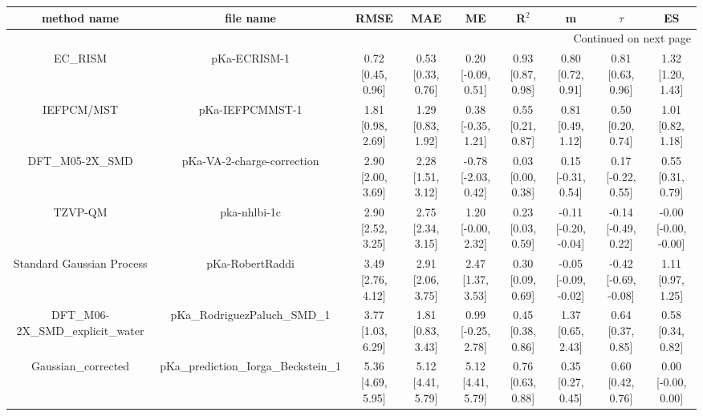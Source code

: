 \documentclass{article}
\begin{document}
\begin{center}
\scriptsize
\begin{longtable}{|ccccccccc|}
\toprule
                   method name &                             file name &               RMSE &                MAE &                   ME &              R$^2$ &                     m &                $\tau$ &                    ES \\
\midrule
\endhead
\midrule
\multicolumn{9}{r}{{Continued on next page}} \\
\midrule
\endfoot

\bottomrule
\endlastfoot
                       EC_RISM &                          pKa-ECRISM-1 &  0.72 [0.45, 0.96] &  0.53 [0.33, 0.76] &   0.20 [-0.09, 0.51] &  0.93 [0.87, 0.98] &     0.80 [0.72, 0.91] &     0.81 [0.63, 0.96] &     1.32 [1.20, 1.43] \\
                    IEFPCM/MST &                       pKa-IEFPCMMST-1 &  1.81 [0.98, 2.69] &  1.29 [0.83, 1.92] &   0.38 [-0.35, 1.21] &  0.55 [0.21, 0.87] &     0.81 [0.49, 1.12] &     0.50 [0.20, 0.74] &     1.01 [0.82, 1.18] \\
                DFT_M05-2X_SMD &            pKa-VA-2-charge-correction &  2.90 [2.00, 3.69] &  2.28 [1.51, 3.12] &  -0.78 [-2.03, 0.42] &  0.03 [0.00, 0.38] &    0.15 [-0.31, 0.54] &    0.17 [-0.22, 0.55] &     0.55 [0.31, 0.79] \\
                       TZVP-QM &                          pka-nhlbi-1c &  2.90 [2.52, 3.25] &  2.75 [2.34, 3.15] &   1.20 [-0.00, 2.32] &  0.23 [0.03, 0.59] &  -0.11 [-0.20, -0.04] &   -0.14 [-0.49, 0.22] &  -0.00 [-0.00, -0.00] \\
     Standard Gaussian Process &                       pKa-RobertRaddi &  3.49 [2.76, 4.12] &  2.91 [2.06, 3.75] &    2.47 [1.37, 3.53] &  0.30 [0.09, 0.69] &  -0.05 [-0.09, -0.02] &  -0.42 [-0.69, -0.08] &     1.11 [0.97, 1.25] \\
 DFT_M06-2X_SMD_explicit_water &          pKa\_RodriguezPaluch\_SMD\_1 &  3.77 [1.03, 6.29] &  1.81 [0.83, 3.43] &   0.99 [-0.25, 2.78] &  0.45 [0.38, 0.86] &     1.37 [0.65, 2.43] &     0.64 [0.37, 0.85] &     0.58 [0.34, 0.82] \\
            Gaussian_corrected &  pKa\_prediction\_Iorga\_Beckstein\_1 &  5.36 [4.69, 5.95] &  5.12 [4.41, 5.79] &    5.12 [4.41, 5.79] &  0.76 [0.63, 0.88] &     0.35 [0.27, 0.45] &     0.60 [0.42, 0.76] &    0.00 [-0.00, 0.00] \\
\end{longtable}
\end{center}
\end{document}
